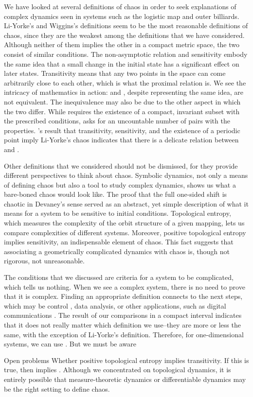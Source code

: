 \documentclass[10pt,twoside,draft]{book}
\begin{document}
We have looked at several definitions of chaos in order to seek explanations of complex dynamics seen in systems such as the logistic map and outer billiards.
Li-Yorke's and Wiggins's definitions seem to be the most reasonable definitions of chaos, since they are the weakest among the definitions that we have considered.
Although neither of them implies the other in a compact metric space, the two consist of similar conditions.
The non-asymptotic relation and sensitivity embody the same idea that a small change in the initial state has a significant effect on later states.
Transitivity means that any two points in the space can come arbitrarily close to each other, which is what the proximal relation is.
We see the intricacy of mathematics in action: \wig and \liy, despite representing the same idea, are not equivalent.
The inequivalence may also be due to the other aspect in which the two differ.
While \wig requires the existence of a compact, invariant subset with the prescribed conditions, \liy asks for an uncountable number of pairs with the properties. 
\citet{mai}'s result that transitivity, sensitivity, and the existence of a periodic point imply Li-Yorke's chaos indicates that there is a delicate relation between \liy and \wig.


Other definitions that we considered should not be dismissed, for they provide different perspectives to think about chaos.
Symbolic dynamics, not only a means of defining chaos but also a tool to study complex dynamics, shows us what a bare-boned chaos would look like.
The proof that the full one-sided shift is chaotic in Devaney's sense served as an abstract, yet simple description of what it means for a system to be sensitive to initial conditions.
Topological entropy, which measures the complexity of the orbit structure of a given mapping, lets us compare complexities of different systems.
Moreover, positive topological entropy implies sensitivity, an indispensable element of chaos.
This fact suggests that associating a geometrically complicated dynamics with chaos is, though not rigorous, not unreasonable.


The conditions that we discussed are criteria for a system to be complicated, which tells us nothing.
When we see a complex system, there is no need to prove that it is complex.
Finding an appropriate definition connects to the next steps, which may be control \citep{openproblems, chaos-frontiers}, data analysis, or other applications, such as digital communications \citep{chaos-communication}.
The result of our comparisons in a compact interval indicates that it does not really matter which definition we use--they are more or less the same, with the exception of Li-Yorke's definition.
Therefore, for one-dimensional systems, we can use .
But we must be aware

Open problems
Whether positive topological entropy implies transitivity. 
If this is true, then \akm implies \wig.
Although we concentrated on topological dynamics, it is entirely possible that measure-theoretic dynamics or differentiable dynamics may be the right setting to define chaos.



\end{document}
